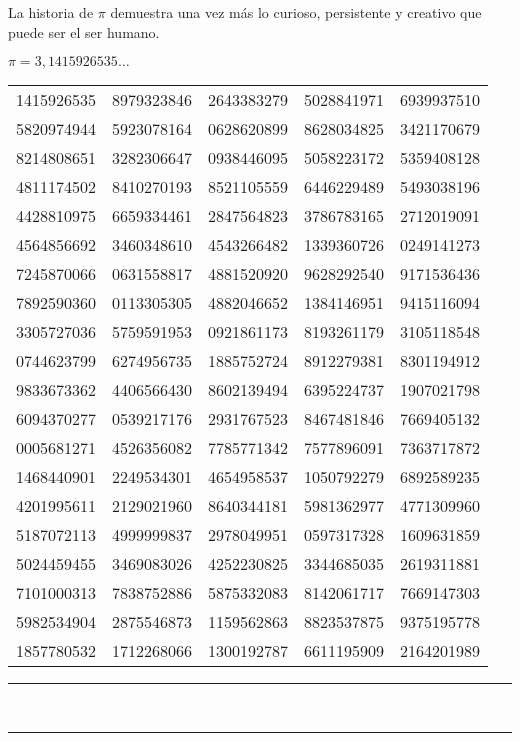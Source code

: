 {La historia de $\pi$ demuestra una vez más lo curioso, persistente y creativo que puede ser el ser humano.

\begin{center}
\Large $\pi = 3,1415926535\ldots$
\end{center}

{%
\renewcommand{\arraystretch}{0.9}
\setlength{\tabcolsep}{0.6em}

\begin{center}
\begin{tabular}{ccccc}
1415926535 & 8979323846 & 2643383279 & 5028841971 & 6939937510 \\
5820974944 & 5923078164 & 0628620899 & 8628034825 & 3421170679 \\
8214808651 & 3282306647 & 0938446095 & 5058223172 & 5359408128 \\
4811174502 & 8410270193 & 8521105559 & 6446229489 & 5493038196 \\
4428810975 & 6659334461 & 2847564823 & 3786783165 & 2712019091 \\
4564856692 & 3460348610 & 4543266482 & 1339360726 & 0249141273 \\
7245870066 & 0631558817 & 4881520920 & 9628292540 & 9171536436 \\
7892590360 & 0113305305 & 4882046652 & 1384146951 & 9415116094 \\
3305727036 & 5759591953 & 0921861173 & 8193261179 & 3105118548 \\
0744623799 & 6274956735 & 1885752724 & 8912279381 & 8301194912 \\
9833673362 & 4406566430 & 8602139494 & 6395224737 & 1907021798 \\
6094370277 & 0539217176 & 2931767523 & 8467481846 & 7669405132 \\
0005681271 & 4526356082 & 7785771342 & 7577896091 & 7363717872 \\
1468440901 & 2249534301 & 4654958537 & 1050792279 & 6892589235 \\
4201995611 & 2129021960 & 8640344181 & 5981362977 & 4771309960 \\
5187072113 & 4999999837 & 2978049951 & 0597317328 & 1609631859 \\
5024459455 & 3469083026 & 4252230825 & 3344685035 & 2619311881 \\
7101000313 & 7838752886 & 5875332083 & 8142061717 & 7669147303 \\
5982534904 & 2875546873 & 1159562863 & 8823537875 & 9375195778 \\
1857780532 & 1712268066 & 1300192787 & 6611195909 & 2164201989 \\
\end{tabular}
\end{center}
}
\begin{center}
\noindent\rule{0.6\linewidth}{0.4pt}\\[-1.5ex]
\noindent\rule{0.6\linewidth}{0.4pt}
\end{center}

}
